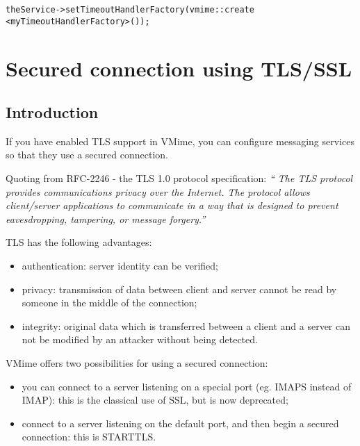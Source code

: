 \begin{lstlisting}
theService->setTimeoutHandlerFactory(vmime::create <myTimeoutHandlerFactory>());
\end{lstlisting}


\newpage
\section{Secured connection using TLS/SSL}

\subsection{Introduction} %

If you have enabled TLS support in VMime, you can configure messaging services
so that they use a secured connection.

Quoting from RFC-2246 - the TLS 1.0 protocol specification: \emph{`` The TLS
protocol provides communications privacy over the Internet. The protocol
allows client/server applications to communicate in a way that is designed
to prevent eavesdropping, tampering, or message forgery.''}

TLS has the following advantages:

\begin{itemize}
\item authentication: server identity can be verified;
\item privacy: transmission of data between client and server cannot be read
by someone in the middle of the connection;
\item integrity: original data which is transferred between a client and a
server can not be modified by an attacker without being detected.
\end{itemize}


VMime offers two possibilities for using a secured connection:

\begin{itemize}
\item you can connect to a server listening on a special port (eg. IMAPS
instead of IMAP): this is the classical use of SSL, but is now deprecated;
\item connect to a server listening on the default port, and then begin a
secured connection: this is STARTTLS.
\end{itemize}


